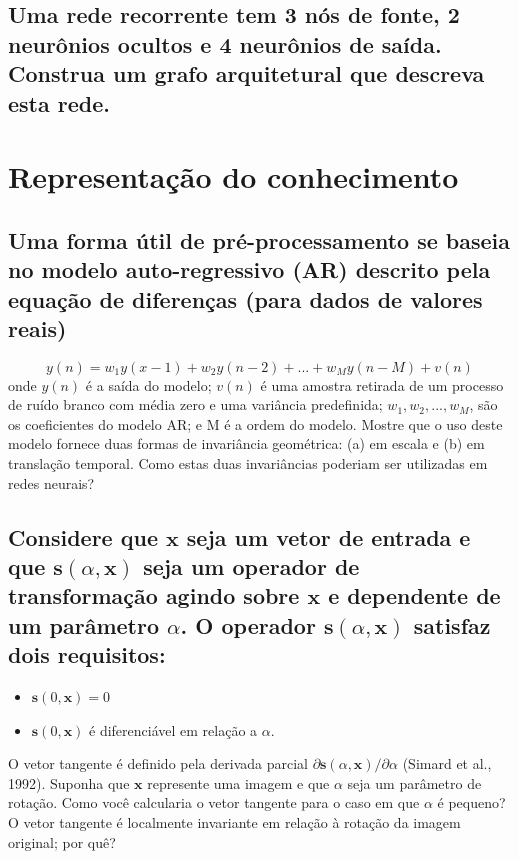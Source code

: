 \documentclass[12pt, openright, a4paper, twoside, english, brazil]{article}
\begin{document}
\subsection{Uma rede recorrente tem 3 nós de fonte, 2 neurônios
ocultos e 4 neurônios de saída. Construa um grafo arquitetural que
descreva esta rede.}

\section{Representação do conhecimento}
\setcounter{section}{1}
\setcounter{subsection}{19}

\subsection{Uma forma útil de pré-processamento se baseia no modelo
auto-regressivo (AR) descrito pela equação de diferenças (para dados
de valores reais)}
$$
y(n)=w_1y(x-1)+w_2y(n-2)+...+w_My(n-M)+v(n)
$$
onde $y(n)$ é a saída do modelo; $v(n)$ é uma amostra retirada de um
processo de ruído branco com média zero e uma variância predefinida;
$w_1,w_2,...,w_M$, são os coeficientes do modelo AR; e M é a ordem do
modelo. Mostre que o uso deste modelo fornece duas formas de
invariância geométrica: (a) em escala e (b) em translação temporal.
Como estas duas invariâncias poderiam ser utilizadas em redes neurais?

\subsection{Considere que $\mathbf x$ seja um vetor de entrada e que
$\mathbf s(\alpha,\mathbf x)$ seja um operador de transformação agindo
sobre $\mathbf x$ e dependente de um parâmetro $\alpha$. O operador
$\mathbf s(\alpha, \mathbf x)$ satisfaz dois requisitos:}
\begin{itemize}
\item $\mathbf s(0, \mathbf x)=0$
\item $\mathbf s(0, \mathbf x)$ é diferenciável em relação a $\alpha$.
\end{itemize}
O vetor tangente é definido pela derivada parcial $\partial\mathbf
s(\alpha,\mathbf x)/\partial\alpha$ (Simard et al., 1992). Suponha
que $\mathbf x$ represente uma imagem e que $\alpha$ seja um
parâmetro de rotação. Como você calcularia o vetor tangente para o
caso em que $\alpha$ é pequeno? O vetor tangente é localmente
invariante em relação à rotação da imagem original; por quê?
\end{document}
